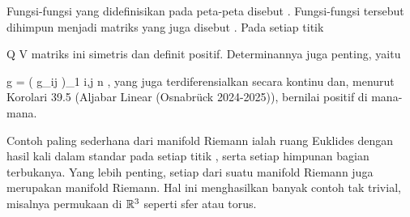Fungsi-fungsi
 yang didefinisikan pada peta-peta disebut
 {} {}
 {.} Fungsi-fungsi tersebut dihimpun menjadi matriks
 yang juga disebut  {}
 {} {.}
Pada setiap titik

\mavergleichskette
{\vergleichskette
{ Q
}
{ \in }{ V
}
{  }{
}
{    }{
}
{   }{
}
}
{}{}{}
matriks ini simetris dan definit positif. Determinannya juga penting, yaitu

\mavergleichskettedisp
{\vergleichskette
{ g
}
{ =} { \det  \left(  g_{ij}  \right)_{1 \leq i,j \leq n}
}
{ } {
}
{ } {
}
{ } {
}
}
{}{}{,}
yang juga terdiferensialkan secara kontinu dan, menurut
Korolari 39.5 (Aljabar Linear (Osnabrück 2024-2025)),
bernilai positif di mana-mana.

Contoh paling sederhana dari manifold Riemann ialah ruang Euklides
 dengan hasil kali dalam standar pada setiap titik
 {} {},
serta setiap himpunan bagian terbukanya. Yang lebih penting, setiap
dari suatu manifold Riemann juga merupakan manifold Riemann. Hal ini menghasilkan banyak contoh tak trivial, misalnya permukaan di ${\mathbb R}^3$ seperti sfer atau torus.




